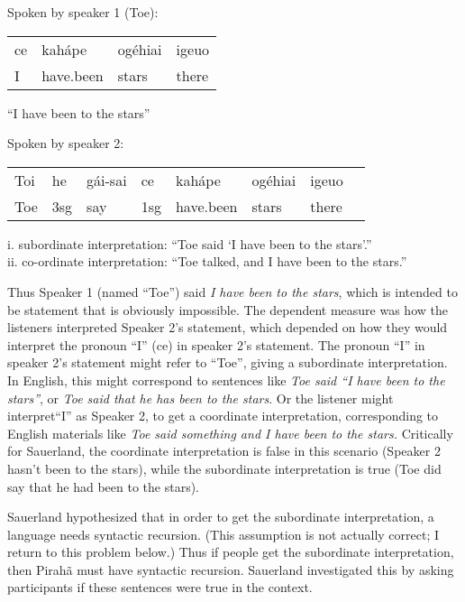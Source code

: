 \documentclass{article}
\begin{document}
\begin{myexample}
\label{sauerland_ex}
\begin{examples}
\item \label{sauerland_ex1} Spoken by speaker 1 (Toe):\\
\begin{tabular}{l l l l}
ce & kahápe & ogéhiai & igeuo \\ 
I & have.been & stars & there\\
\end{tabular}

``I have been to the stars''

\item \label{sauerland_ex2} Spoken by speaker 2:\\
\begin{tabular}{l l l l l l l l}
Toi & he & gái-sai & ce & kahápe & ogéhiai & igeuo \\
Toe & 3sg & say & 1sg & have.been & stars & there\\
\end{tabular}


i. subordinate interpretation: ``Toe said ‘I have been to the stars’.''\\
ii. co-ordinate interpretation: ``Toe talked, and I have been to the stars.''
\end{examples}
\end{myexample}

Thus Speaker 1 (named ``Toe'') said \textit{I have been to the stars}, which is intended to be statement that is obviously impossible. The dependent measure was how the listeners interpreted Speaker 2's statement, which depended on how they would interpret the pronoun ``I'' (ce) in speaker 2’s statement. The pronoun ``I'' in speaker 2’s statement might refer to ``Toe'', giving  a subordinate interpretation. In English, this might correspond to sentences like \textit{Toe said ``I have been to the stars''}, or \textit{Toe said that he has been to the stars}. Or the listener might interpret``I'' as Speaker 2, to get a coordinate interpretation, corresponding to English materials like \textit{Toe said something and I have been to the stars.}  Critically for Sauerland, the coordinate interpretation is false in this scenario (Speaker 2 hasn’t been to the stars), while the subordinate interpretation is true (Toe did say that he had been to the stars).

Sauerland hypothesized that in order to get the subordinate interpretation, a language needs syntactic recursion. (This assumption is not actually correct; I return to this problem below.) Thus if people get the subordinate interpretation, then Pirahã must have syntactic recursion. Sauerland investigated this by asking participants if these sentences were true in the context. 
\end{document}
